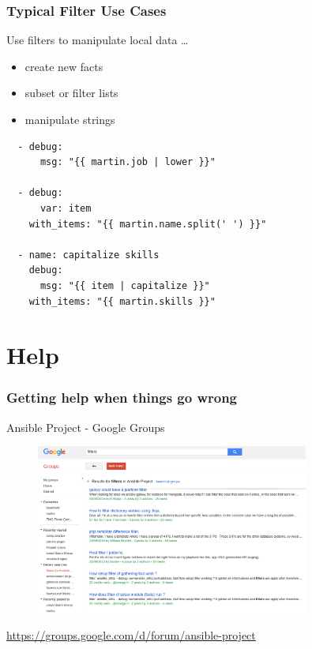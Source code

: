 \documentclass[pdf]{beamer}
\begin{document}
\begin{frame}[fragile]
  \frametitle{Typical Filter Use Cases}
  Use filters to manipulate local data \ldots
  \begin{itemize}
    \item {create new facts}
    \item {subset or filter lists}
    \item \alert {manipulate strings}
  \end{itemize}
  \begin{lstlisting}
  - debug:
      msg: "{{ martin.job | lower }}"

  - debug:
      var: item
    with_items: "{{ martin.name.split(' ') }}"

  - name: capitalize skills
    debug:
      msg: "{{ item | capitalize }}"
    with_items: "{{ martin.skills }}"
  \end{lstlisting}
\end{frame}

\section{Help}


\begin{frame}[fragile]
  \frametitle{Getting help when things go wrong}
  Ansible Project - Google Groups
  \begin{center}
    \begin{figure}
      \includegraphics[width=0.8\textwidth]{ansible-google-group.png}
    \end{figure}
  \end{center}
  \tiny \url{https://groups.google.com/d/forum/ansible-project}
\end{frame}
\end{document}
